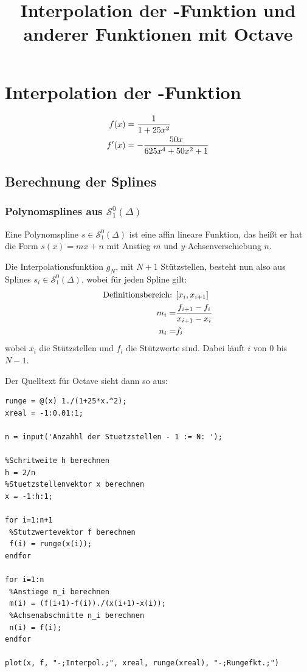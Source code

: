 \documentclass[ngerman,a4paper]{texmf/tex/latex/mathscript/mathscript}
\title{\textbf{Interpolation der \person{Runge}-Funktion und anderer Funktionen mit Octave}}
\begin{document}
\maketitle
	
\tableofcontents
\pagebreak
	
\section{Interpolation der -Funktion}	
	\begin{align}
		f(x) &= \frac{1}{1+25x^2}\notag \\
		f' (x) &= -\frac{50x}{625x^4+50x^2+1}\notag
	\end{align}
	
	\subsection{Berechnung der Splines}\label{1.1}
	\subsubsection{Polynomsplines aus $\mathcal{S}_1^0(\Delta)$}
	
	Eine Polynomspline $s\in\mathcal{S}_1^0(\Delta)$ ist eine affin lineare Funktion, das heißt er hat die Form $s(x)=mx+n$ mit Anstieg $m$ und $y$-Achsenverschiebung $n$. 
	
	Die Interpolationsfunktion $g_N$, mit $N+1$ Stützstellen, besteht nun also aus Splines $s_i\in\mathcal{S}_1^0(\Delta)$, wobei für jeden Spline gilt:
	\begin{align}
		\text{Definitionsbereich: } & [x_i,x_{i+1}] \notag \\
		m_i =& \frac{f_{i+1}-f_i}{x_{i+1}-x_i}\notag \\
		n_i =& f_i \notag
	\end{align} 
	wobei $x_i$ die Stützstellen und $f_i$ die Stützwerte sind. Dabei läuft $i$ von $0$ bis $N-1$.
	
	Der Quelltext für Octave sieht dann so aus:
\begin{lstlisting}
runge = @(x) 1./(1+25*x.^2);
xreal = -1:0.01:1;

n = input('Anzahhl der Stuetzstellen - 1 := N: ');

%Schritweite h berechnen
h = 2/n
%Stuetzstellenvektor x berechnen
x = -1:h:1;

for i=1:n+1
 %Stutzwertevektor f berechnen
 f(i) = runge(x(i));
endfor

for i=1:n
 %Anstiege m_i berechnen
 m(i) = (f(i+1)-f(i))./(x(i+1)-x(i));
 %Achsenabschnitte n_i berechnen
 n(i) = f(i);
endfor

plot(x, f, "-;Interpol.;", xreal, runge(xreal), "-;Rungefkt.;")
\end{lstlisting}
\end{document}
